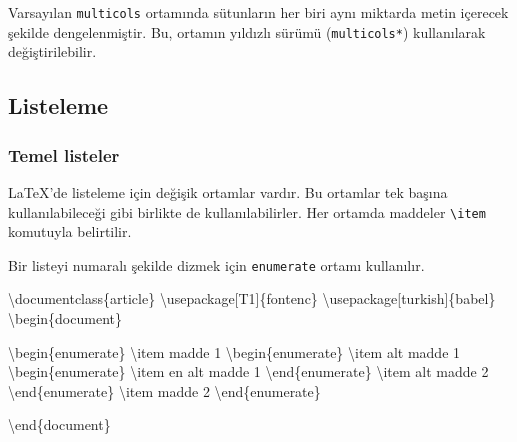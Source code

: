 \documentclass[
  letterpaper,
  DIV=11,
  numbers=noendperiod]{scrreprt}
\newenvironment{Shaded}{\begin{snugshade}}{\end{snugshade}}
\newcommand{\BuiltInTok}[1]{\textcolor[rgb]{0.00,0.23,0.31}{#1}}
\newcommand{\ExtensionTok}[1]{\textcolor[rgb]{0.00,0.23,0.31}{#1}}
\newcommand{\FunctionTok}[1]{\textcolor[rgb]{0.28,0.35,0.67}{#1}}
\newcommand{\KeywordTok}[1]{\textcolor[rgb]{0.00,0.23,0.31}{#1}}
\newcommand{\NormalTok}[1]{\textcolor[rgb]{0.00,0.23,0.31}{#1}}
\begin{document}
Varsayılan \texttt{multicols} ortamında sütunların her biri aynı
miktarda metin içerecek şekilde dengelenmiştir. Bu, ortamın yıldızlı
sürümü (\texttt{multicols*}) kullanılarak değiştirilebilir.

\hypertarget{listeleme}{%
\subsection{Listeleme}\label{listeleme}}

\hypertarget{temel-listeler}{%
\subsubsection{Temel listeler}\label{temel-listeler}}

{\LaTeX}'de listeleme için değişik ortamlar vardır. Bu ortamlar tek
başına kullanılabileceği gibi birlikte de kullanılabilirler. Her ortamda
maddeler \texttt{\textbackslash{}item} komutuyla belirtilir.

Bir listeyi numaralı şekilde dizmek için \texttt{enumerate} ortamı
kullanılır.

\begin{Shaded}
\begin{Highlighting}[]
\BuiltInTok{\textbackslash{}documentclass}\NormalTok{\{}\ExtensionTok{article}\NormalTok{\}}
\BuiltInTok{\textbackslash{}usepackage}\NormalTok{[T1]\{}\ExtensionTok{fontenc}\NormalTok{\}}
\BuiltInTok{\textbackslash{}usepackage}\NormalTok{[turkish]\{}\ExtensionTok{babel}\NormalTok{\}}
\KeywordTok{\textbackslash{}begin}\NormalTok{\{}\ExtensionTok{document}\NormalTok{\}}

\KeywordTok{\textbackslash{}begin}\NormalTok{\{}\ExtensionTok{enumerate}\NormalTok{\}}
 \FunctionTok{\textbackslash{}item}\NormalTok{ madde 1}
  \KeywordTok{\textbackslash{}begin}\NormalTok{\{}\ExtensionTok{enumerate}\NormalTok{\}}
    \FunctionTok{\textbackslash{}item}\NormalTok{ alt madde 1}
      \KeywordTok{\textbackslash{}begin}\NormalTok{\{}\ExtensionTok{enumerate}\NormalTok{\}}
        \FunctionTok{\textbackslash{}item}\NormalTok{ en alt madde 1}
      \KeywordTok{\textbackslash{}end}\NormalTok{\{}\ExtensionTok{enumerate}\NormalTok{\}}
    \FunctionTok{\textbackslash{}item}\NormalTok{ alt madde 2}
  \KeywordTok{\textbackslash{}end}\NormalTok{\{}\ExtensionTok{enumerate}\NormalTok{\}}
 \FunctionTok{\textbackslash{}item}\NormalTok{ madde 2}
\KeywordTok{\textbackslash{}end}\NormalTok{\{}\ExtensionTok{enumerate}\NormalTok{\}}

\KeywordTok{\textbackslash{}end}\NormalTok{\{}\ExtensionTok{document}\NormalTok{\}}
\end{Highlighting}
\end{Shaded}
\end{document}
